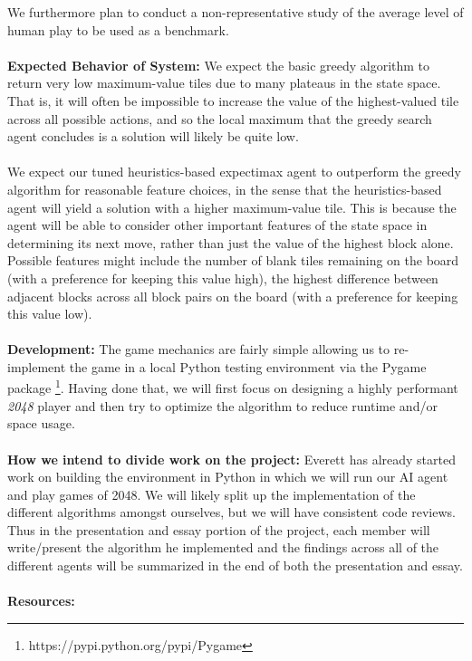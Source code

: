 \documentclass[11pt]{article}
\begin{document}
\noindent We furthermore plan to conduct a non-representative study of the average level of human play to be used as a benchmark.
\\\\
\textbf{Expected Behavior of System: }
We expect the basic greedy algorithm to return very low maximum-value tiles due to many plateaus in the state space.  That is, it will often be impossible to increase the value of the highest-valued tile across all possible actions, and so the local maximum that the greedy search agent concludes is a solution will likely be quite low.
\\\\
We expect our tuned heuristics-based expectimax agent to outperform the greedy algorithm for reasonable feature choices, in the sense that the heuristics-based agent will yield a solution with a higher maximum-value tile.  This is because the agent will be able to consider other important features of the state space in determining its next move, rather than just the value of the highest block alone.  Possible features might include the number of blank tiles remaining on the board (with a preference for keeping this value high), the highest difference between adjacent blocks across all block pairs on the board (with a preference for keeping this value low).\\\\
\textbf{Development: } The game mechanics are fairly simple allowing us to re-implement the game in a local Python testing environment via the Pygame package \footnote{https://pypi.python.org/pypi/Pygame}. Having done that, we will first focus on designing a highly performant \textit{2048} player and then try to optimize the algorithm to reduce runtime and/or space usage.
\\\\
\textbf{How we intend to divide work on the project: } Everett has already started work on building the environment in Python in which we will run our AI agent and play games of 2048.  We will likely split up the implementation of the different algorithms amongst ourselves, but we will have consistent code reviews.  Thus in the presentation and essay portion of the project, each member will write/present the algorithm he implemented and the findings across all of the different agents will be summarized in the end of both the presentation and essay.
\\\\
\noindent \textbf{Resources: }
\end{document}

